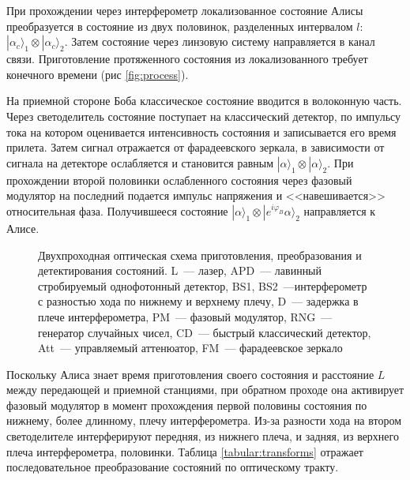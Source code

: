 При прохождении через интерферометр локализованное состояние Алисы преобразуется в состояние из двух половинок, разделенных интервалом $l$: $|\alpha_c\rangle_1 \otimes |\alpha_c\rangle_2$. 
Затем состояние через линзовую систему направляется в канал связи. Приготовление протяженного состояния из локализованного требует конечного времени (рис \ref{fig:process}).

На приемной стороне Боба классическое состояние вводится в волоконную часть. 
Через светоделитель состояние поступает на классический детектор, по импульсу тока на котором оценивается интенсивность состояния и записывается его время прилета. 
Затем сигнал отражается от фарадеевского зеркала, в зависимости от сигнала на детекторе ослабляется и становится равным $|\alpha\rangle_1 \otimes |\alpha\rangle_2$.
При прохождении второй половинки ослабленного состояния через фазовый модулятор на последний подается импульс напряжения и <<навешивается>> относительная фаза.
Получившееся состояние $|\alpha\rangle_1 \otimes |e^{i\varphi_B}\alpha\rangle_2$ направляется к Алисе.

\begin{figure}[h]
\caption{
Двухпроходная оптическая схема приготовления, преобразования и детектирования состояний.
L~--- лазер, APD~--- лавинный стробируемый однофотонный детектор, BS1, BS2~---интерферометр с разностью хода по нижнему и верхнему плечу,
D~--- задержка в плече интерферометра, PM~--- фазовый модулятор, RNG~--- генератор случайных чисел,
CD~--- быстрый классический детектор, Att~--- управляемый аттенюатор, FM~--- фарадеевское зеркало
}
\label{fig:scheme}
\end{figure}

Поскольку Алиса знает время приготовления своего состояния и расстояние $L$ между передающей и приемной станциями, при обратном проходе она активирует фазовый модулятор в момент прохождения первой половины состояния по нижнему, более длинному, плечу интерферометра. 
Из-за разности хода на втором светоделителе интерферируют передняя, из нижнего плеча, и задняя, из верхнего плеча интерферометра, половинки.
Таблица \ref{tabular:transforms} отражает последовательное преобразование состояний по оптическому тракту.

